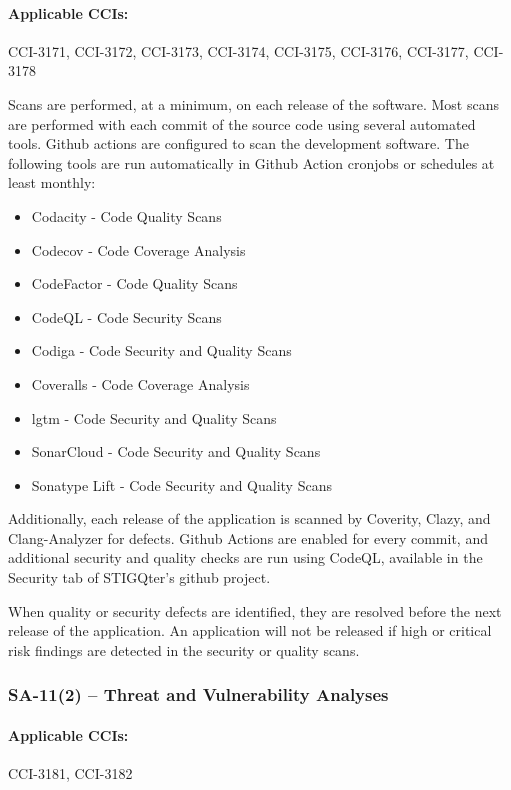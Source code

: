 \documentclass[letterpaper, 10pt, twoside]{article}
\begin{document}
\paragraph{Applicable CCIs:} CCI-3171, CCI-3172, CCI-3173, CCI-3174, CCI-3175, CCI-3176, CCI-3177, CCI-3178

Scans are performed, at a minimum, on each release of the software. Most scans are performed with each commit of the source code using several automated tools. Github actions are configured to scan the development software. The following tools are run automatically in Github Action cronjobs or schedules at least monthly:
\begin{itemize}
	\item Codacity - Code Quality Scans
	\item Codecov - Code Coverage Analysis
	\item CodeFactor - Code Quality Scans
	\item CodeQL - Code Security Scans
	\item Codiga - Code Security and Quality Scans
	\item Coveralls - Code Coverage Analysis
	\item lgtm - Code Security and Quality Scans
	\item SonarCloud - Code Security and Quality Scans
	\item Sonatype Lift - Code Security and Quality Scans
\end{itemize}

Additionally, each release of the application is scanned by Coverity, Clazy, and Clang-Analyzer for defects. Github Actions are enabled for every commit, and additional security and quality checks are run using CodeQL, available in the Security tab of STIGQter's github project.

When quality or security defects are identified, they are resolved before the next release of the application. An application will not be released if high or critical risk findings are detected in the security or quality scans.

\subsubsection{SA-11(2) -- Threat and Vulnerability Analyses}

\paragraph{Applicable CCIs:} CCI-3181, CCI-3182
\end{document}
